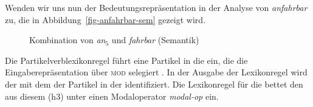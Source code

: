 Wenden wir uns nun der Bedeutungsrepräsentation in der Analyse von \emph{anfahrbar} zu,
die in Abbildung~\vref{fig-anfahrbar-sem} gezeigt wird.
\begin{figure}
\caption{Kombination von \emph{an}$_5$ und \emph{fahrbar} (Semantik)}\label{fig-anfahrbar-sem}
\end{figure}
Die Partikelverblexikonregel führt eine Partikel in die \argstl ein,
die die Eingaberepräsentation über \textsc{mod} selegiert . In der Ausgabe der
Lexikonregel wird der \contw {} mit dem \contw der Partikel in der \argstl identifiziert.
Die Lexikonregel für die  \bard bettet den \ltopw aus diesem \contw (h3) unter einen Modaloperator \emph{modal-op} ein.
